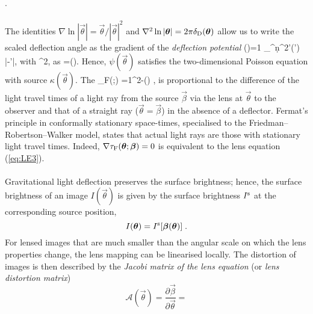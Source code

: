 {.
\\
\\
The identities $\nabla \ln |\vec\theta|=\vec\theta/|\vec\theta|^2$
and $\nabla^2\ln|\vec\theta|=2\pi\delta_{\rm D}(\vec\theta)$ allow us to
write the scaled deflection angle as the gradient of the {\it
  deflection potential}
%
\be
\psi(\vec\theta)={1\over
\pi}\int_{^n}\d^2\theta'\;\kappa(\vec\theta')\,
\ln|\vec\theta-\vec\theta'|\;, \quad \hbox{with} \quad
\nabla^2\kappa\;, \quad
\hbox{as}\quad
\vec \alpha =\nabla\psi(\vec\theta)\;.
\label{eq:LE6}
\ee
%
Hence, $\psi(\vec\theta)$ satisfies the two-dimensional Poisson
equation with
source $\kappa(\vec\theta)$. The  
%
\be
\tau_{\rm F}(\vec\theta;\vec\beta) ={1}\rund{\vec\theta-\vec\beta}^2-\psi(\vec\theta)\; , 
\label{eq:LE7}
\ee
%
is proportional to the difference of the light travel times of a light ray
from the source $\vec\beta$ via the lens at $\vec\theta$ to the
observer and  that of a straight ray ($\vec\theta=\vec\beta$) in the
absence of a deflector. Fermat's principle in conformally stationary 
space-times, specialised to the Friedman--Robertson--Walker
model, states that actual light rays are those with stationary light
travel times. Indeed, $\nabla\tau_{\rm F}(\vec\theta;\vec\beta)=0$ is
equivalent to the lens equation (\ref{eq:LE3}).
\\
\\
Gravitational light deflection preserves the surface brightness;
hence, the surface brightness of an image $I(\vec\theta)$ is given by
the surface brightness $I^{\rm s}$ at the corresponding source
position,
%
\begin{equation}
  I(\vec\theta) = I^{\rm s}[\vec\beta(\vec\theta)]\;.
\label{eq:LE8}
\end{equation}
%
For lensed images that are much smaller than the angular scale on
which the lens properties change, the lens mapping can be
linearised
locally. The distortion of images is then described by the {\it Jacobi
matrix of the lens equation} (or {\it lens distortion matrix}) 
\begin{equation}
  \mathcal{A}(\vec\theta) =
  \frac{\partial\vec\beta}{\partial\vec\theta} =

\end{equation}}
